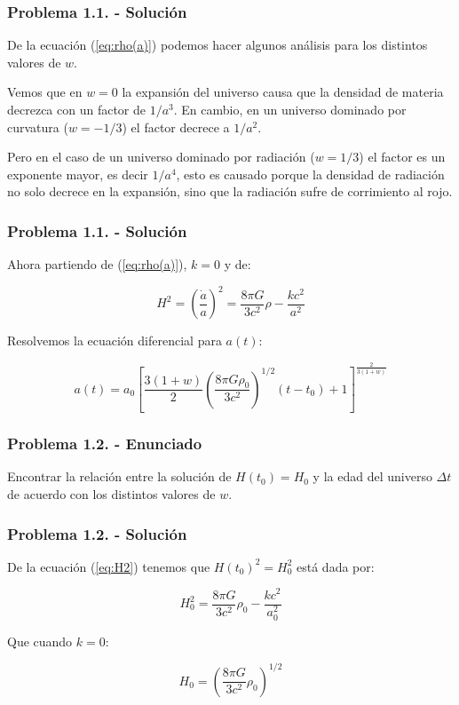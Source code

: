 \begin{frame}
    \frametitle{Problema 1.1. - Solución}

    De la ecuación (\ref{eq:rho(a)}) podemos hacer algunos análisis para los distintos valores de $w$.

    Vemos que en $w=0$ la expansión del universo causa que la densidad de materia decrezca con un factor de $1/a^3$. En cambio, en un universo dominado por curvatura ($w=-1/3$) el factor decrece a $1/a^2$.

    Pero en el caso de un universo dominado por radiación ($w=1/3$) el factor es un exponente mayor, es decir $1/a^4$, esto es causado porque la densidad de radiación no solo decrece en la expansión, sino que la radiación sufre de corrimiento al rojo.
\end{frame}

\begin{frame}
    \frametitle{Problema 1.1. - Solución}

    Ahora partiendo de (\ref{eq:rho(a)}), $k=0$ y de:

    \begin{equation}
        H^2=\left(\frac{\dot{a}}{a}\right)^2=\frac{8\pi G}{3c^2}\rho-\frac{kc^2}{a^2}\label{eq:H2}
    \end{equation}

    Resolvemos la ecuación diferencial para $a(t)$:

    \begin{equation}
        a(t) = a_0\left[\frac{3\left(1+w\right)}{2}\left(\frac{8\pi G \rho_0}{3c^2}\right)^{1/2}\left(t-t_0\right)+1\right]^{\frac{2}{3\left(1+w\right)}}
        \label{eq:a(t)}
    \end{equation}

\end{frame}

\begin{frame}
    \frametitle{Problema 1.2. - Enunciado}

    Encontrar la relación entre la solución de $H(t_0)=H_0$ y la edad del universo $\Delta t$ de acuerdo con los distintos valores de $w$.

\end{frame}

\begin{frame}
    \frametitle{Problema 1.2. - Solución}

    De la ecuación (\ref{eq:H2}) tenemos que $H(t_0)^2=H_0^2$ está dada por:

    \begin{equation*}
        H_0^2=\frac{8 \pi G}{3c^2}\rho_0-\frac{kc^2}{a_0^2}
    \end{equation*}

    Que cuando $k=0$:

    \begin{equation}
        H_0=\left(\frac{8 \pi G}{3c^2}\rho_0\right)^{1/2}\label{eq:H_0}
    \end{equation}


\end{frame}

